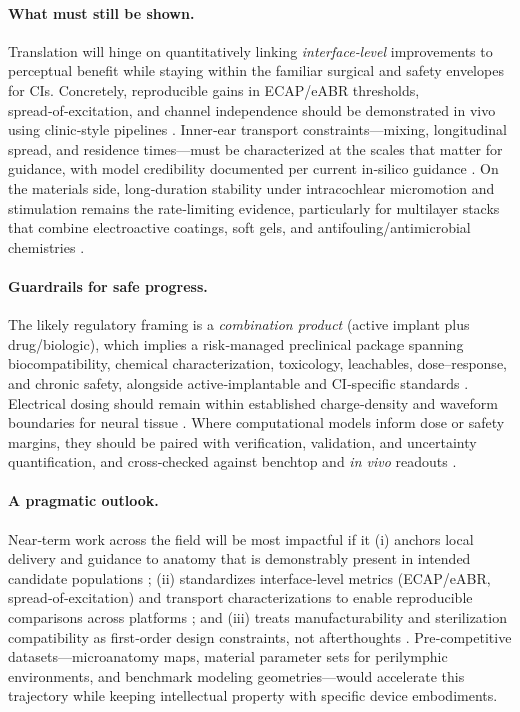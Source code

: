 \documentclass[referee,pdflatex, sn-vancouver-num]{sn-jnl}%
\theoremstyle{thmstyleone}%
\theoremstyle{thmstyletwo}%
\theoremstyle{thmstylethree}%
\begin{document}
\paragraph{What must still be shown.}
Translation will hinge on quantitatively linking \emph{interface‑level} improvements to perceptual benefit while staying within the familiar surgical and safety envelopes for CIs. Concretely, reproducible gains in ECAP/eABR thresholds, spread‑of‑excitation, and channel independence should be demonstrated in vivo using clinic‑style pipelines \cite{Micco2006,Rebscher2008,wilson2008,wilson2014}. Inner‑ear transport constraints—mixing, longitudinal spread, and residence times—must be characterized at the scales that matter for guidance, with model credibility documented per current in‑silico guidance \cite{SaltPlontke2009,Leake2013,USFDA2021InSilico,ASMEVV40_2018}. On the materials side, long‑duration stability under intracochlear micromotion and stimulation remains the rate‑limiting evidence, particularly for multilayer stacks that combine electroactive coatings, soft gels, and antifouling/antimicrobial chemistries \cite{Dalrymple2020,Horne2023}.

\paragraph{Guardrails for safe progress.}
The likely regulatory framing is a \emph{combination product} (active implant plus drug/biologic), which implies a risk‑managed preclinical package spanning biocompatibility, chemical characterization, toxicology, leachables, dose–response, and chronic safety, alongside active‑implantable and CI‑specific standards \cite{ISO10993-1_2018_Biocompatibility,ISO14708-7:2016_CI}. Electrical dosing should remain within established charge‑density and waveform boundaries for neural tissue \cite{Merrill2005_Waveforms,Cogan2008_NeuralElectrodes}. Where computational models inform dose or safety margins, they should be paired with verification, validation, and uncertainty quantification, and cross‑checked against benchtop and \emph{in vivo} readouts \cite{USFDA2021InSilico,ASMEVV40_2018}.

\paragraph{A pragmatic outlook.}
Near‑term work across the field will be most impactful if it (i) anchors local delivery and guidance to anatomy that is demonstrably present in intended candidate populations \cite{raskandersen2006,lim1970}; (ii) standardizes interface‑level metrics (ECAP/eABR, spread‑of‑excitation) and transport characterizations to enable reproducible comparisons across platforms \cite{Micco2006,Rebscher2008}; and (iii) treats manufacturability and sterilization compatibility as first‑order design constraints, not afterthoughts \cite{Dalrymple2020,Horne2023}. Pre‑competitive datasets—microanatomy maps, material parameter sets for perilymphic environments, and benchmark modeling geometries—would accelerate this trajectory while keeping intellectual property with specific device embodiments.
\end{document}
